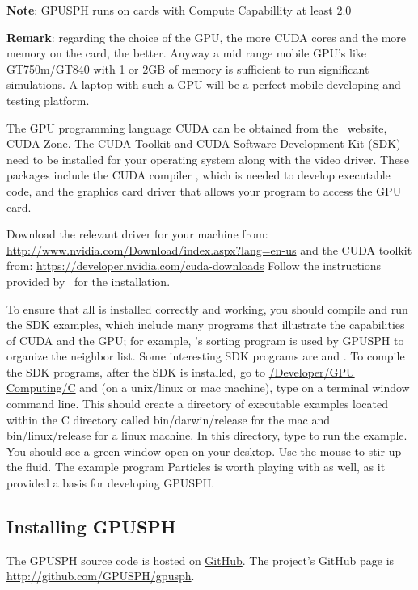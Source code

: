 \documentclass{../GPUSPHtemplate}
\begin{document}
\textbf{Note}: GPUSPH runs on cards with Compute Capabillity at least 2.0


\textbf{Remark}: regarding the choice of the GPU, the more CUDA 
cores and the more memory on the card, the better. Anyway a
mid range mobile GPU's like GT750m/GT840 with 1 or 2GB of memory
is sufficient to run significant simulations. A laptop with such a GPU will be
a perfect mobile developing and testing platform.

The GPU programming language CUDA can be obtained from the \nvidia\ website,
CUDA Zone. The CUDA Toolkit and CUDA Software Development Kit (SDK)
need to be installed for your operating system along with the video
driver. These packages include the CUDA compiler , which is
needed to develop executable code, and the graphics card driver that
allows your program to access the GPU card.

Download the relevant driver for your machine from:
\url{http://www.nvidia.com/Download/index.aspx?lang=en-us}
and the CUDA toolkit from:
\url{https://developer.nvidia.com/cuda-downloads}
Follow the instructions provided by \nvidia\ for the installation.


To ensure that all is installed correctly and working, you should
compile and run the SDK examples, which include many programs that
illustrate the capabilities of CUDA and the GPU; for example, \nvidia's
sorting program  is used by GPUSPH to organize the
neighbor list. Some interesting SDK programs are  and
. To compile the SDK programs, after the SDK is
installed, go to \url{/Developer/GPU Computing/C} and (on a unix/linux
or mac machine), type  on a terminal window command line. This
should create a directory of executable examples located within the C
directory called bin/darwin/release for the mac and bin/linux/release
for a linux machine. In this directory, type  to run
the  example. You should see a green window open on your
desktop. Use the mouse to stir up the fluid. The example program
Particles is worth playing with as well, as it provided a basis for
developing GPUSPH.



\subsection{Installing GPUSPH}

The GPUSPH source code is hosted on \href{http://github.com}{GitHub}.
The project's GitHub page is \url{http://github.com/GPUSPH/gpusph}.
\end{document}
